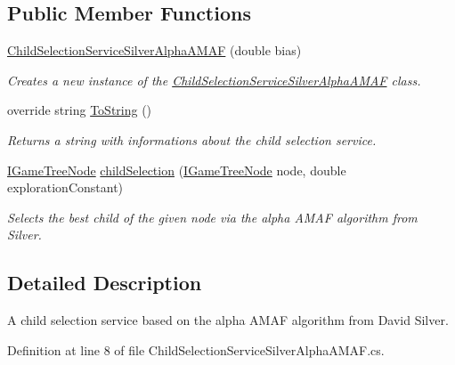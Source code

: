\subsection*{Public Member Functions}
\begin{DoxyCompactItemize}
\item 
\mbox{\hyperlink{class_game_tree_core_1_1_child_selection_service_silver_alpha_a_m_a_f_a9f0b3952f37fab8b91e69950263934a7}{Child\+Selection\+Service\+Silver\+Alpha\+A\+M\+AF}} (double bias)
\begin{DoxyCompactList}\small\item\em Creates a new instance of the \mbox{\hyperlink{class_game_tree_core_1_1_child_selection_service_silver_alpha_a_m_a_f}{Child\+Selection\+Service\+Silver\+Alpha\+A\+M\+AF}} class. \end{DoxyCompactList}\item 
override string \mbox{\hyperlink{class_game_tree_core_1_1_child_selection_service_silver_alpha_a_m_a_f_a205abab62a400c3aa5bf9830047249dd}{To\+String}} ()
\begin{DoxyCompactList}\small\item\em Returns a string with informations about the child selection service. \end{DoxyCompactList}\item 
\mbox{\hyperlink{interface_game_tree_core_1_1_i_game_tree_node}{I\+Game\+Tree\+Node}} \mbox{\hyperlink{class_game_tree_core_1_1_child_selection_service_silver_alpha_a_m_a_f_af06bf48345ee92a0057b6cc9dbd47a9e}{child\+Selection}} (\mbox{\hyperlink{interface_game_tree_core_1_1_i_game_tree_node}{I\+Game\+Tree\+Node}} node, double exploration\+Constant)
\begin{DoxyCompactList}\small\item\em Selects the best child of the given node via the alpha A\+M\+AF algorithm from Silver. \end{DoxyCompactList}\end{DoxyCompactItemize}


\subsection{Detailed Description}
A child selection service based on the alpha A\+M\+AF algorithm from David Silver. 



Definition at line 8 of file Child\+Selection\+Service\+Silver\+Alpha\+A\+M\+A\+F.\+cs.



